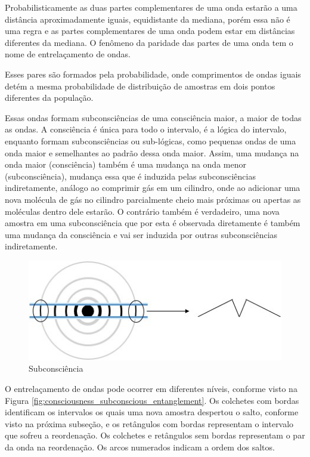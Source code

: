 Probabilisticamente as duas partes complementares de uma onda estarão a uma distância aproximadamente iguais, equidistante da mediana, porém essa não é uma regra e as partes complementares de uma onda podem estar em distâncias diferentes da mediana. O fenômeno da paridade das partes de uma onda tem o nome de entrelaçamento de ondas.

Esses pares são formados pela probabilidade, onde comprimentos de ondas iguais detém a mesma probabilidade de distribuição de amostras em dois pontos diferentes da população. 

Essas ondas formam subconsciências de uma consciência maior, a maior de todas as ondas. A consciência é única para todo o intervalo, é a lógica do intervalo, enquanto formam subconsciências ou sub-lógicas, como pequenas ondas de uma onda maior e semelhantes ao padrão dessa onda maior. Assim, uma mudança na onda maior (consciência) também é uma mudança na onda menor (subconsciência), mudança essa que é induzida pelas subconsciências indiretamente, análogo ao comprimir gás em um cilindro, onde ao adicionar uma nova molécula de gás no cilindro parcialmente cheio mais próximas ou apertas as moléculas dentro dele estarão. O contrário também é verdadeiro, uma nova amostra em uma subconsciência que por esta é observada diretamente é também uma mudança da consciência e vai ser induzida por outras subconsciências indiretamente.
	\begin{figure}[H]
	\caption{Subconsciência}
	\label{fig:consciousness_subconscious}
	\centering
	\includegraphics[scale=.8]{sections/images/consciousness_subconscious.jpg}
	\end{figure}
	
O entrelaçamento de ondas pode ocorrer em diferentes níveis, conforme visto na Figura \ref{fig:consciousness_subconscious_entanglement}. Os colchetes com bordas identificam os intervalos os quais uma nova amostra despertou o salto, conforme visto na próxima subseção, e os retângulos com bordas representam o intervalo que sofreu a reordenação. Os colchetes e retângulos sem bordas representam o par da onda na reordenação. Os arcos numerados indicam a ordem dos saltos.

